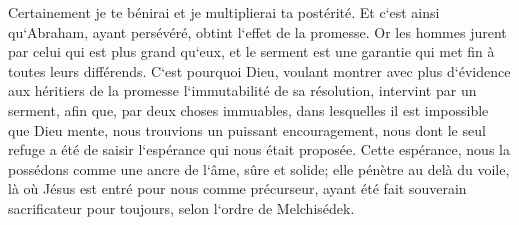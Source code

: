 \verse Certainement je te bénirai et je multiplierai ta postérité. 
\verse Et c`est ainsi qu`Abraham, ayant persévéré, obtint l`effet de la promesse. 
\verse Or les hommes jurent par celui qui est plus grand qu`eux, et le serment est une garantie qui met fin à toutes leurs différends. 
\verse C`est pourquoi Dieu, voulant montrer avec plus d`évidence aux héritiers de la promesse l`immutabilité de sa résolution, intervint par un serment, 
\verse afin que, par deux choses immuables, dans lesquelles il est impossible que Dieu mente, nous trouvions un puissant encouragement, nous dont le seul refuge a été de saisir l`espérance qui nous était proposée. 
\verse Cette espérance, nous la possédons comme une ancre de l`âme, sûre et solide; elle pénètre au delà du voile, 
\verse là où Jésus est entré pour nous comme précurseur, ayant été fait souverain sacrificateur pour toujours, selon l`ordre de Melchisédek. 

